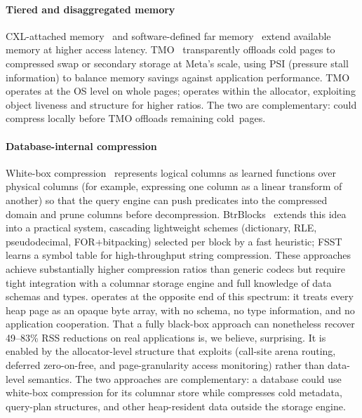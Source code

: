 \paragraph{Tiered and disaggregated memory}
CXL-attached memory~\cite{pond2022cxl, maruf2023tpp} and
software-defined far memory~\cite{amaro2023memory} extend available
memory at higher access latency.  TMO~\cite{weiner2022tmo}
transparently offloads cold pages to compressed swap or secondary
storage at Meta's scale, using PSI (pressure stall information) to
balance memory savings against application performance.  TMO operates
at the OS level on whole pages; \sys operates within the allocator,
exploiting object liveness and structure for higher ratios.  The two
are complementary: \sys could compress locally before TMO offloads
remaining cold~pages.

\paragraph{Database-internal compression}
White-box compression~\cite{ghita2020whitebox} represents logical
columns as learned functions over physical columns (for example,
expressing one column as a linear transform of another) so that
the query engine can push predicates into the compressed domain
and prune columns before decompression.  BtrBlocks~\cite{kuschewski2023btrblocks}
extends this idea into a practical system, cascading lightweight
schemes (dictionary, RLE, pseudodecimal, FOR+bitpacking) selected per
block by a fast heuristic; FSST~\cite{boncz2020fsst} learns a
symbol table for high-throughput string compression.  These approaches
achieve substantially higher compression ratios than generic codecs
but require tight integration with a columnar storage engine and full
knowledge of data schemas and types.
%
\sys operates at the opposite end of this spectrum: it treats every
heap page as an opaque byte array, with no schema, no type
information, and no application cooperation.  That a fully black-box
approach can nonetheless recover 49--83\% RSS reductions on
real applications is, we believe, surprising.  It is enabled by
the allocator-level structure that \sys exploits (call-site arena
routing, deferred zero-on-free, and page-granularity access
monitoring) rather than data-level semantics.  The two approaches are
complementary: a database could use white-box compression for its
columnar store while \sys compresses cold metadata, query-plan
structures, and other heap-resident data outside the storage engine.

